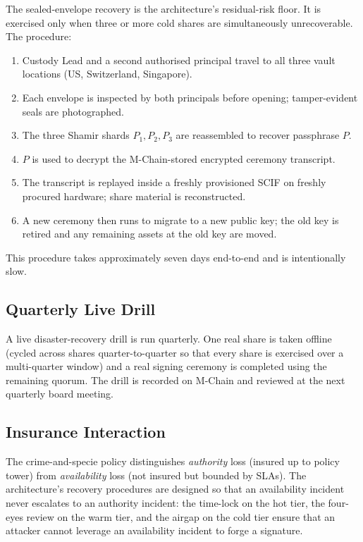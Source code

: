The sealed-envelope recovery is the architecture's residual-risk
floor. It is exercised only when three or more cold shares are
simultaneously unrecoverable. The procedure:

\begin{enumerate}[nosep]
\item Custody Lead and a second authorised principal travel to all
three vault locations (US, Switzerland, Singapore).
\item Each envelope is inspected by both principals before opening;
tamper-evident seals are photographed.
\item The three Shamir shards $P_1, P_2, P_3$ are reassembled to
recover passphrase $P$.
\item $P$ is used to decrypt the M-Chain-stored encrypted ceremony
transcript.
\item The transcript is replayed inside a freshly provisioned SCIF
on freshly procured hardware; share material is reconstructed.
\item A new ceremony then runs to migrate to a new public key; the
old key is retired and any remaining assets at the old key are
moved.
\end{enumerate}

This procedure takes approximately seven days end-to-end and is
intentionally slow.

\subsection{Quarterly Live Drill}

A live disaster-recovery drill is run quarterly. One real share is
taken offline (cycled across shares quarter-to-quarter so that every
share is exercised over a multi-quarter window) and a real signing
ceremony is completed using the remaining quorum. The drill is
recorded on M-Chain and reviewed at the next quarterly board meeting.

\subsection{Insurance Interaction}

The crime-and-specie policy distinguishes \emph{authority} loss
(insured up to policy tower) from \emph{availability} loss (not
insured but bounded by SLAs). The architecture's recovery procedures
are designed so that an availability incident never escalates to an
authority incident: the time-lock on the hot tier, the four-eyes
review on the warm tier, and the airgap on the cold tier ensure that
an attacker cannot leverage an availability incident to forge a
signature.

